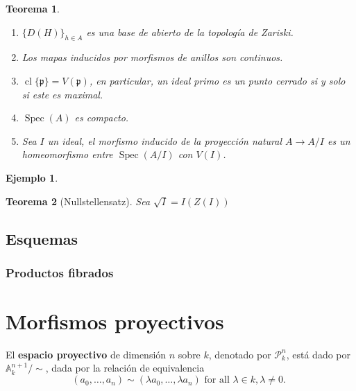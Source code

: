 \documentclass[12pt]{book}
\newtheorem{eje}{Ejemplo}
\newtheorem{teo}{Teorema}
\begin{document}
\begin{teo}
\begin{enumerate}
\item $\{D(H)\}_{h\in A}$ es una base de abierto de la topología de Zariski.
\item Los mapas inducidos por morfismos de anillos son continuos.
\item $\operatorname{cl} \{\mathfrak{p}\} = V(\mathfrak{p})$,  en particular, un ideal primo es un punto cerrado si y solo si este es maximal.
\item $\operatorname{Spec}(A)$ es compacto. 
\item Sea $I$ un ideal, el morfismo inducido de la proyección natural $A \rightarrow A/I$ es un homeomorfismo entre $\operatorname{Spec}(A/I) $ con $V(I)$.

\end{enumerate}
\end{teo}

\begin{eje}

\end{eje}



\begin{teo}[Nullstellensatz]
Sea $ \sqrt{I}= I(Z(I))$
\end{teo}





\section{Esquemas}



\subsection{Productos fibrados}



\chapter{Morfismos proyectivos}

El \textbf{espacio proyectivo} de dimensión $n$ sobre $k$, denotado por $\mathcal{P}^n_k$, está dado por $\mathbb{A}^{n+1}_k /\sim$, dada por la relación de equivalencia $$
\left(a_0, \ldots, a_n\right) \sim\left(\lambda a_0, \ldots, \lambda a_n\right) \text { for all } \lambda \in k, \lambda \neq 0 \text {. }
$$
\end{document}
